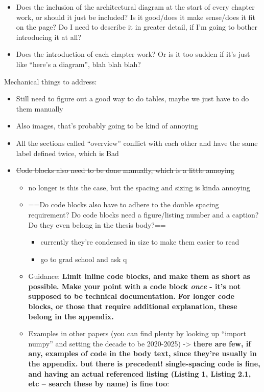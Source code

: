 \begin{itemize}
\tightlist
\item
  Does the inclusion of the architectural diagram at the start of every
  chapter work, or should it just be included? Is it good/does it make
  sense/does it fit on the page? Do I need to describe it in greater
  detail, if I'm going to bother introducing it at all?
\item
  Does the introduction of each chapter work? Or is it too sudden if
  it's just like ``here's a diagram'', blah blah blah?
\end{itemize}

Mechanical things to address:

\begin{itemize}
\tightlist
\item
  Still need to figure out a good way to do tables, maybe we just have
  to do them manually
\item
  Also images, that's probably going to be kind of annoying
\item
  All the sections called ``overview'' conflict with each other and have
  the same label defined twice, which is Bad
\item
  \st{Code blocks also need to be done manually, which is a little
  annoying}

  \begin{itemize}
  \tightlist
  \item
    no longer is this the case, but the spacing and sizing is kinda
    annoying
  \item
    ==Do code blocks also have to adhere to the double spacing
    requirement? Do code blocks need a figure/listing number and a
    caption? Do they even belong in the thesis body?==

    \begin{itemize}
    \tightlist
    \item
      currently they're condensed in size to make them easier to read
    \item
      go to grad school and ask q
    \end{itemize}
  \item
    Guidance: \textbf{Limit inline code blocks, and make them as short
    as possible. Make your point with a code block \emph{once} - it's
    not supposed to be technical documentation. For longer code blocks,
    or those that require additional explanation, these belong in the
    appendix.}
  \item
    Examples in other papers (you can find plenty by looking up ``import
    numpy'' and setting the decade to be 2020-2025) -\textgreater{}
    \textbf{there are few, if any, examples of code in the body text,
    since they're usually in the appendix. but there is precedent!
    single-spacing code is fine, and having an actual referenced listing
    (Listing 1, Listing 2.1, etc -- search these by name) is fine too}:


\end{itemize}
\end{itemize}
